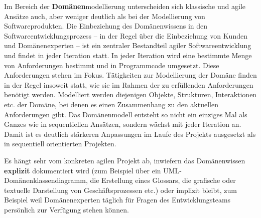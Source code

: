 \vspace{3mm} %


\vspace{3mm} %

Im  Bereich der \textbf{Domänen}modellierung 
unterscheiden sich klassische und agile Ansätze auch, aber weniger deutlich als bei der Modellierung von Softwareprodukten. Die Einbeziehung des Domänenwissens in den Softwareentwicklungsprozess – in der Regel über die Einbeziehung von Kunden und Domänenexperten – ist ein zentraler Bestandteil agiler Softwareentwicklung und findet in jeder Iteration statt. In jeder Iteration wird eine bestimmte Menge von Anforderungen bestimmt und in Programmcode umgesetzt. Diese Anforderungen stehen im Fokus. Tätigkeiten zur Modellierung der Domäne finden in der Regel insoweit statt, wie sie im Rahmen der zu erfüllenden Anforderungen benötigt werden. Modelliert werden diejenigen Objekte, Strukturen, Interaktionen etc. der Domäne, bei denen es einen Zusammenhang zu den aktuellen Anforderungen gibt. Das Domänenmodell entsteht so nicht ein einziges Mal als Ganzes wie in sequentiellen Ansätzen, sondern wächst mit jeder Iteration an. Damit ist es deutlich stärkeren Anpassungen im Laufe des Projekts ausgesetzt als in sequentiell orientierten Projekten.

Es hängt sehr vom konkreten agilen Projekt ab, inwiefern das Domänenwissen \textbf{\mbox{explizit}} dokumentiert wird (zum Beispiel über ein UML-Domänen\-klassen\-diagramm, die Erstellung eines Glossars, die grafische oder textuelle Darstellung von Geschäfts\-prozessen etc.) oder implizit bleibt, zum Beispiel weil Domänenexperten täglich für Fragen des Entwicklungsteams persönlich zur Verfügung stehen können. 